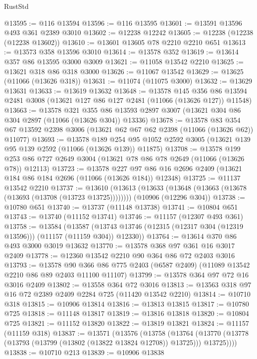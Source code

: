 \begin{lexlean}{RustStd}
\begin{coremodule}
@13595 := @116 @13594
@13596 := @116 @13595
@13601 := @13591 @13596 @493 @361 @2389 @3010
@13602 := @12238 @12242
@13605 := @12238 (@12238 (@12238 @13602))
@13610 := @13601 @13605 @78 @2210 @2210 @651
@13613 := @13573 @358 @13596 @3010
@13614 := @13578 @352
@13619 := @13614 @357 @86 @13595 @3000 @3009
@13621 := @11058 @13542 @2210
@13625 := @13621 @318 @86 @318 @3000
@13626 := @11067 @13542
@13629 := @13625 (@11066 (@13626 @318))
@13631 := @11074 (@11075 @3000)
@13632 := @13629 @13631
@13633 := @13619 @13632
@13648 := @13578
    @145
    @356
    @86
    @13594
    @2481
    @3008
    (@13621 @127 @86 @127 @2481 (@11066 (@13626 @127)) @11548)
@13663 := @13578
    @321
    @355
    @86
    @13593
    @2897
    @3007
    (@13621 @304 @86 @304 @2897 (@11066 (@13626 @304)) @13336)
@13678 := @13578
    @83
    @354
    @67
    @13592
    @2398
    @3006
    (@13621 @62 @67 @62 @2398 (@11066 (@13626 @62)) @11077)
@13693 := @13578
    @189
    @254
    @95
    @1052
    @2592
    @3005
    (@13621 @139 @95 @139 @2592 (@11066 (@13626 @139)) @11875)
@13708 := @13578
    @199
    @253
    @86
    @727
    @2649
    @3004
    (@13621 @78 @86 @78 @2649 (@11066 (@13626 @78)) @12113)
@13723 := @13578
    @227
    @97
    @86
    @16
    @2696
    @2409
    (@13621 @184 @86 @184 @2696 (@11066 (@13626 @184)) @12348)
@13725 := @11137 @13542 @2210
@13737 := @13610
    (@13613 (@13633 (@13648 (@13663 (@13678 (@13693 (@13708 (@13723 @13725))))))))
    (@10906 (@12296 @304))
@13738 := @10780 @651
@13740 := @13737 (@11148 @13738)
@13741 := @10804 @651
@13743 := @13740 (@11152 @13741)
@13746 := @11157 (@12307 @493 @361)
@13758 := @13584
    (@13587 (@13743 @13746 (@12315 (@12317 @304 (@12319 @13596))) (@11157 (@11159 @304)) @12330))
@13764 := @13614 @370 @86 @493 @3000 @3019 @13632
@13770 := @13578 @368 @97 @361 @16 @3017 @2409
@13778 := @12360 @13542 @2210 @90 @364 @86 @72 @2403 @3016
@13793 := @13578
    @90
    @366
    @86
    @775
    @2403
    (@6587 @2409)
    (@11089 @13542 @2210 @86 @89 @2403 @11100 @11107)
@13799 := @13578 @364 @97 @72 @16 @3016 @2409
@13802 := @13558 @364 @72 @3016
@13813 := @13563 @318 @97 @16 @72 @2389 @2409 @2284 @725 (@11420 @13542 @2210)
@13814 := @10710 @318
@13815 := @10906 @13814
@13816 := @13813 @13815
@13817 := @10780 @725
@13818 := @11148 @13817
@13819 := @13816 @13818
@13820 := @10804 @725
@13821 := @11152 @13820
@13822 := @13819 @13821
@13824 := @11157 (@11159 @318)
@13837 := @13571
    (@13576
      (@13758
        (@13764 (@13770 (@13778 (@13793 (@13799 (@13802 (@13822 @13824 @12708)) @13725))) @13725))))
@13838 := @10710 @213
@13839 := @10906 @13838

\end{coremodule}
\end{lexlean}
